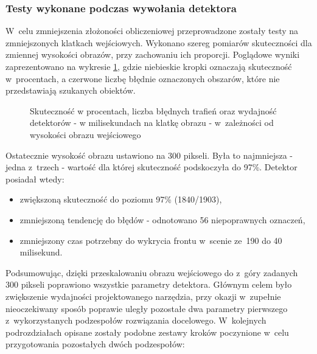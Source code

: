 \subsubsection{Testy wykonane podczas wywołania detektora}

W~celu zmniejszenia złożoności obliczeniowej przeprowadzone zostały
testy na zmniejszonych klatkach wejściowych. 
Wykonano szereg pomiarów skuteczności dla zmiennej
wysokości obrazów, przy zachowaniu ich proporcji. Poglądowe wyniki zaprezentowano na
wykresie \ref{chart:img_height2hitratio}, gdzie niebieskie kropki oznaczają skuteczność w~procentach, a czerwone liczbę
błędnie oznaczonych obszarów, które nie przedstawiają szukanych obiektów.

\begin{figure}[h!]
	\begin{center}
	\end{center}
	\caption{Skuteczność w procentach, liczba błędnych trafień oraz
		wydajność detektorów - w milisekundach na klatkę obrazu -
		w~zależności od wysokości obrazu wejściowego}
	\label{chart:img_height2hitratio}
\end{figure}

Ostatecznie wysokość obrazu ustawiono na 300 pikseli. Była to najmniejsza - jedna
z~trzech - wartość dla której skuteczność podskoczyła do 97\%.
Detektor posiadał wtedy:
\begin{itemize}
	\item zwiększoną skuteczność do poziomu 97\% (1840/1903),
	\item zmniejszoną tendencję do błędów - odnotowano 56 niepoprawnych oznaczeń,
	\item zmniejszony czas potrzebny do wykrycia frontu w~scenie 
	ze~190 do 40 milisekund.
\end{itemize}

Podsumowując, dzięki przeskalowaniu obrazu wejściowego do z~góry zadanych
300 pikseli poprawiono wszystkie parametry detektora. 
Głównym celem było zwiększenie wydajności projektowanego narzędzia, przy
okazji w~zupełnie nieoczekiwany sposób poprawie uległy pozostałe dwa parametry
pierwszego z~wykorzystanych podzespołów rozwiązania docelowego.
W~kolejnych podrozdziałach opisane zostały podobne zestawy kroków
poczynione w~celu przygotowania pozostałych dwóch podzespołów:

